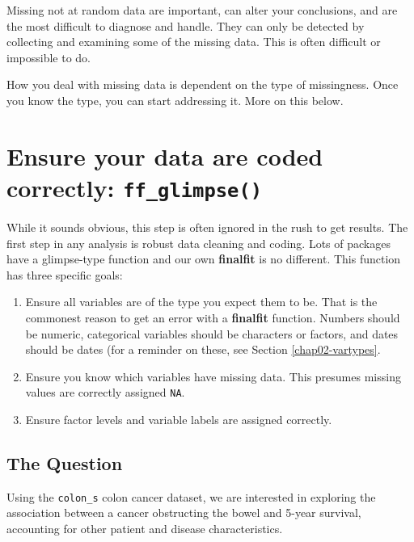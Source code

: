 \documentclass[
  12pt,
  krantz2]{krantz}
\providecommand{\tightlist}{%
  \setlength{\itemsep}{0pt}\setlength{\parskip}{0pt}}
\begin{document}
Missing not at random data are important, can alter your conclusions, and are the most difficult to diagnose and handle.
They can only be detected by collecting and examining some of the missing data.
This is often difficult or impossible to do.

How you deal with missing data is dependent on the type of missingness.
Once you know the type, you can start addressing it.
More on this below.

\hypertarget{ensure-your-data-are-coded-correctly-ff_glimpse}{%
\section{\texorpdfstring{Ensure your data are coded correctly: \texttt{ff\_glimpse()}}{Ensure your data are coded correctly: ff\_glimpse()}}\label{ensure-your-data-are-coded-correctly-ff_glimpse}}


While it sounds obvious, this step is often ignored in the rush to get results.
The first step in any analysis is robust data cleaning and coding.
Lots of packages have a glimpse-type function and our own \textbf{finalfit} is no different.
This function has three specific goals:

\begin{enumerate}
\def\labelenumi{\arabic{enumi}.}
\tightlist
\item
  Ensure all variables are of the type you expect them to be. That is the commonest reason to get an error with a \textbf{finalfit} function. Numbers should be numeric, categorical variables should be characters or factors, and dates should be dates (for a reminder on these, see Section \ref{chap02-vartypes}.
\item
  Ensure you know which variables have missing data. This presumes missing values are correctly assigned \texttt{NA}.
\item
  Ensure factor levels and variable labels are assigned correctly.
\end{enumerate}

\hypertarget{the-question-6}{%
\subsection{The Question}\label{the-question-6}}

Using the \texttt{colon\_s} colon cancer dataset, we are interested in exploring the association between a cancer obstructing the bowel and 5-year survival, accounting for other patient and disease characteristics.
\end{document}
